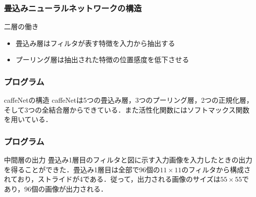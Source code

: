\documentclass[dvipdfmx,11pt,notheorems]{beamer}
\theoremstyle{definition}
\begin{document}
\begin{frame}[fragile]\frametitle{畳込みニューラルネットワークの構造}


\begin{block}{二層の働き}
\begin{itemize}
\item 畳込み層はフィルタが表す特徴を入力から抽出する
\item プーリング層は抽出された特徴の位置感度を低下させる
\end{itemize}
\end{block}

\end{frame}


\begin{frame}\frametitle{プログラム}
\begin{block}{caffeNetの構造}
caffeNetは5つの畳込み層，3つのプーリング層，2つの正規化層，そして3つの全結合層からできている．また活性化関数にはソフトマックス関数を用いている．
\end{block}
\end{frame}

\begin{frame}\frametitle{プログラム}
\begin{block}{中間層の出力}
畳込み1層目のフィルタと図に示す入力画像を入力したときの出力を得ることができた．畳込み1層目は全部で96個の$11\times11$のフィルタから構成されており，ストライドが4である．従って，出力される画像のサイズは$55\times55$であり，96個の画像が出力される．
\end{block}
\end{frame}
\end{document}
